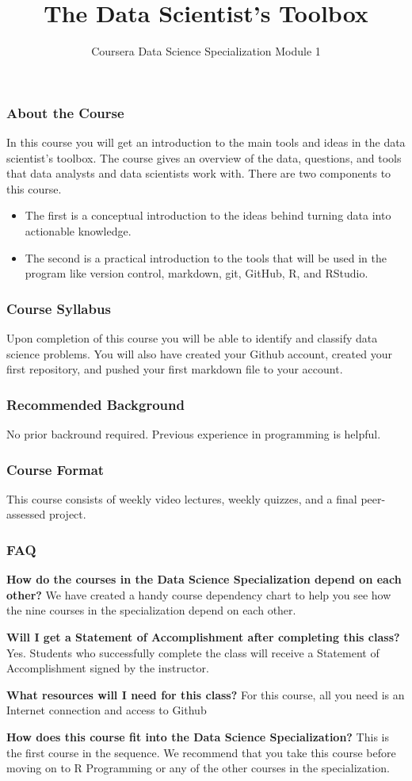 \documentclass[]{article}
\title{The Data Scientist's Toolbox}
\author{Coursera Data Science Specialization Module 1}
\begin{document}
\maketitle

\subsubsection*{About the Course}
In this course you will get an introduction to the main tools and ideas in the data scientist's toolbox. The course gives an overview of the data, questions, and tools that data analysts and data scientists work with. There are two components to this course. 
\begin{itemize}
\item The first is a conceptual introduction to the ideas behind turning data into actionable knowledge. 
\item The second is a practical introduction to the tools that will be used in the program like version control, markdown, git, GitHub, R, and RStudio.
\end{itemize}
\subsubsection*{Course Syllabus}
Upon completion of this course you will be able to identify and classify data science problems. You will also have created your Github account, created your first repository, and pushed your first markdown file to your account.
\subsubsection*{Recommended Background}
No prior backround required. Previous experience in programming is helpful.
\subsubsection*{Course Format}
This course consists of weekly video lectures, weekly quizzes, and a final peer-assessed project.
\subsubsection*{FAQ}
\textbf{How do the courses in the Data Science Specialization depend on each other?}
We have created a handy course dependency chart to help you see how the nine courses in the specialization depend on each other.

\textbf{Will I get a Statement of Accomplishment after completing this class?}
Yes. Students who successfully complete the class will receive a Statement of Accomplishment signed by the instructor.

\textbf{What resources will I need for this class?}
For this course, all you need is an Internet connection and access to Github 

\textbf{How does this course fit into the Data Science Specialization?}
This is the first course in the sequence. We recommend that you take this course before moving on to R Programming or any of the other courses in the specialization.
\end{document}
